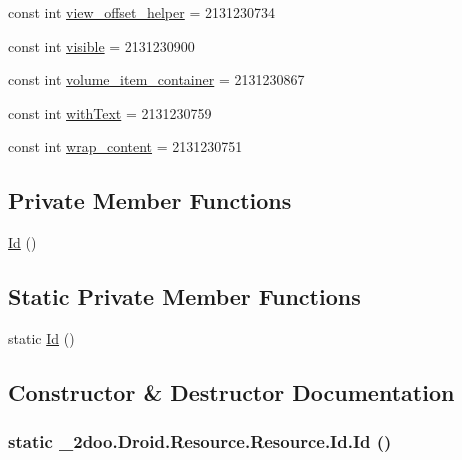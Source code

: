 \begin{CompactItemize}
\item 
const int \hyperlink{class__2doo_1_1_droid_1_1_resource_1_1_id_7a25e6a891d73b110d6d730a33ad238b}{view\_\-offset\_\-helper} = 2131230734
\item 
const int \hyperlink{class__2doo_1_1_droid_1_1_resource_1_1_id_0e1668ac9417c93779a098a631fc15cc}{visible} = 2131230900
\item 
const int \hyperlink{class__2doo_1_1_droid_1_1_resource_1_1_id_54b1cd09685865f4e856a9f21af509d6}{volume\_\-item\_\-container} = 2131230867
\item 
const int \hyperlink{class__2doo_1_1_droid_1_1_resource_1_1_id_e1c5bda7a7a2f08966f48ff8e842e231}{withText} = 2131230759
\item 
const int \hyperlink{class__2doo_1_1_droid_1_1_resource_1_1_id_e9c511a647597d2c27a6e4074a283736}{wrap\_\-content} = 2131230751
\end{CompactItemize}
\subsection*{Private Member Functions}
\begin{CompactItemize}
\item 
\hyperlink{class__2doo_1_1_droid_1_1_resource_1_1_id_bc4f6d9a468ddf441eb64eeb0590b9b1}{Id} ()
\end{CompactItemize}
\subsection*{Static Private Member Functions}
\begin{CompactItemize}
\item 
static \hyperlink{class__2doo_1_1_droid_1_1_resource_1_1_id_dc7b7fd152f592dc2fc85365ed2b399f}{Id} ()
\end{CompactItemize}


\subsection{Constructor \& Destructor Documentation}
\hypertarget{class__2doo_1_1_droid_1_1_resource_1_1_id_dc7b7fd152f592dc2fc85365ed2b399f}{
\subsubsection[{Id}]{\setlength{\rightskip}{0pt plus 5cm}static \_\-2doo.Droid.Resource.Resource.Id.Id ()}}
\label{class__2doo_1_1_droid_1_1_resource_1_1_id_dc7b7fd152f592dc2fc85365ed2b399f}


